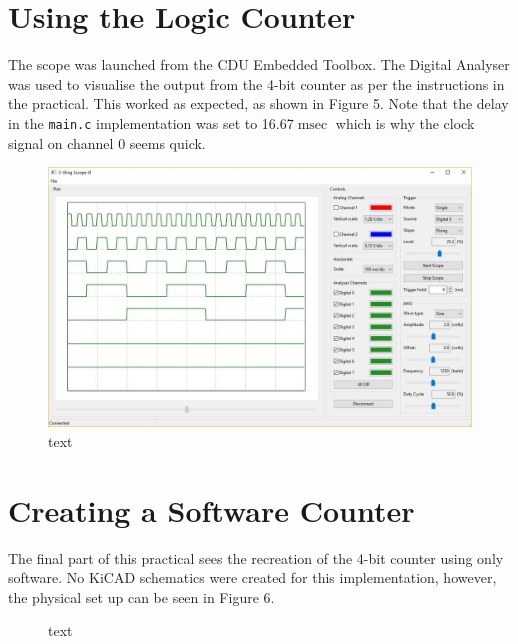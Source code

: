 \documentclass[a4paper]{article}
\begin{document}
\section{Using the Logic Counter}
The scope was launched from the CDU Embedded Toolbox. The Digital Analyser was used to visualise the output from the 4-bit counter as per the instructions in the practical. This worked as expected, as shown in Figure 5. Note that the delay in the \verb|main.c| implementation was set to 16.67$\si{\milli\sec}$ which is why the clock signal on channel 0 seems quick.
\begin{figure}[h]
	\centering
	\includegraphics[scale=0.45]{fig5}
	\caption{text}
\end{figure}

\section{Creating a Software Counter}
The final part of this practical sees the recreation of the 4-bit counter using only software. No KiCAD schematics were created for this implementation, however, the physical set up can be seen in Figure 6.

\begin{figure}[h]
	\centering
	\caption{text}
\end{figure}
\end{document}
